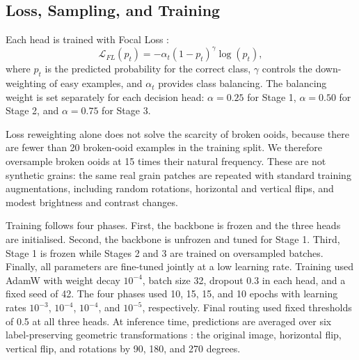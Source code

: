 \documentclass[conference, a4paper]{IEEEtran}
\begin{document}
\subsection{Loss, Sampling, and Training}
Each head is trained with Focal Loss \cite{lin2017focal}:
\begin{equation}
\mathcal{L}_{FL}(p_t)=-\alpha_t(1-p_t)^\gamma\log(p_t),
\label{eq:focal_loss}
\end{equation}
where $p_t$ is the predicted probability for the correct class, $\gamma$ controls the down-weighting of easy examples, and $\alpha_t$ provides class balancing. The balancing weight is set separately for each decision head: $\alpha=0.25$ for Stage 1, $\alpha=0.50$ for Stage 2, and $\alpha=0.75$ for Stage 3.

Loss reweighting alone does not solve the scarcity of broken ooids, because there are fewer than 20 broken-ooid examples in the training split. We therefore oversample broken ooids at 15 times their natural frequency. These are not synthetic grains: the same real grain patches are repeated with standard training augmentations, including random rotations, horizontal and vertical flips, and modest brightness and contrast changes.
\begin{table}[t]
\caption{Per-class recall on the 529-grain held-out test set for ablations of the proposed hierarchical pipeline. BA is Balanced Accuracy and OA is Overall Accuracy.}
\label{tab:ablation}
\centering
{}
\end{table}

Training follows four phases. First, the backbone is frozen and the three heads are initialised. Second, the backbone is unfrozen and tuned for Stage 1. Third, Stage 1 is frozen while Stages 2 and 3 are trained on oversampled batches. Finally, all parameters are fine-tuned jointly at a low learning rate. Training used AdamW with weight decay $10^{-4}$, batch size 32, dropout 0.3 in each head, and a fixed seed of 42. The four phases used 10, 15, 15, and 10 epochs with learning rates $10^{-3}$, $10^{-4}$, $10^{-4}$, and $10^{-5}$, respectively. Final routing used fixed thresholds of 0.5 at all three heads. At inference time, predictions are averaged over six label-preserving geometric transformations \cite{shanmugam2021tta}: the original image, horizontal flip, vertical flip, and rotations by 90, 180, and 270 degrees.
\end{document}
